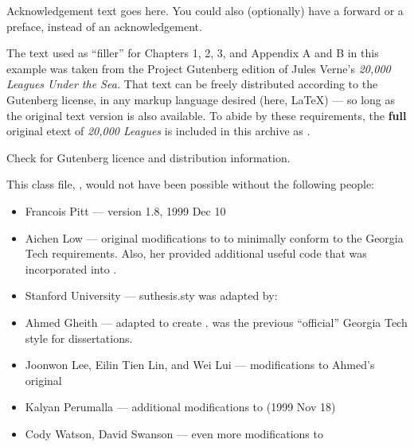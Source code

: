 \begin{acknowledgements}
Acknowledgement text goes here.  You could also (optionally)
have a forward or a preface, instead of an acknowledgement.

The text used as ``filler'' for Chapters 1, 2, 3, and 
Appendix A and B in this example was taken from the Project
Gutenberg edition of Jules Verne's \textit{20,000 Leagues Under the Sea.}
That text can be freely distributed according to the Gutenberg
license, in any markup language desired (here, \LaTeX) --- so long
as the original text version is also available.  To abide by
these requirements, the \textbf{full} original etext of
\textit{20,000 Leagues} is included in this archive as 
.

Check  for Gutenberg licence and distribution
information.

This class file, , would not have been
possible without the following people:
\begin{itemize}
\itemsep 0in
\parsep 0in
\item Francois Pitt ---  version 1.8, 1999 Dec 10
\item Aichen Low --- original modifications to  to 
minimally conform to the Georgia Tech requirements.  Also, her
 provided additional useful 
code that was incorporated into .
\item Stanford University --- suthesis.sty was adapted by:
\item Ahmed Gheith --- adapted  to create 
.   was the 
previous ``official'' Georgia Tech style for dissertations.
\item Joonwon Lee, Eilin Tien Lin, and Wei Lui --- modifications to Ahmed's
original 
\item Kalyan Perumalla --- additional modifications to 
(1999 Nov 18)
\item Cody Watson, David Swanson --- even more modifications to 
\end{itemize}
\end{acknowledgements}